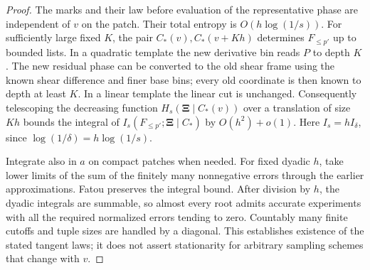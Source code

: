 \begin{proof}
The marks and their law before evaluation of the representative
phase are independent of \(v\) on the patch. Their total
entropy is \(O(h\log(1/s))\). For sufficiently large fixed
\(K\), the pair \(C_*(v),C_*(v+Kh)\) determines
\(F_{\leq p'}\) up to bounded lists. In a quadratic template
the new derivative bin reads \(P\) to depth \(K\). The new
residual phase can be converted to the old shear frame using
the known shear difference and finer base bins; every old
coordinate is then known to depth at least \(K\). In a
linear template the linear cut is unchanged. Consequently
telescoping the decreasing function
\(H_s(\boldsymbol\Xi\mid C_*(v))\) over a translation
of size \(Kh\) bounds the integral of
\(I_s(F_{\leq p'};\boldsymbol\Xi\mid C_*)\) by
\(O(h^2)+o(1)\). Here \(I_s=hI_\delta\), since
\(\log(1/\delta)=h\log(1/s)\).

Integrate also in \(a\) on compact patches when needed.
For fixed dyadic \(h\), take lower limits of the sum of the
finitely many nonnegative errors through the earlier
approximations. Fatou preserves the integral bound. After
division by \(h\), the dyadic integrals are summable, so
almost every root admits accurate experiments with all the
required normalized errors tending to zero. Countably many
finite cutoffs and tuple sizes are handled by a diagonal.
This establishes existence of the stated tangent laws; it
does not assert stationarity for arbitrary sampling schemes
that change with \(v\).


\end{proof}
